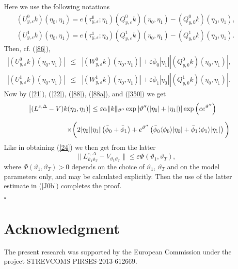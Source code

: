 \documentclass[reqno,11pt]{amsart}
\theoremstyle{definition}
\theoremstyle{remark}
\numberwithin{equation}{section}
\begin{document}
Here we use the following notations
\begin{gather*}
  
(U^0_{y,\varepsilon} k) (\eta_0,\eta_1) =
e(\tau^0_{y,\varepsilon};\eta_1) (Q^0_{y,\varepsilon} k)
(\eta_0,\eta_1) - (Q^0_{y,0} k) (\eta_0,\eta_1), \\[.2cm]
(U^1_{y,\varepsilon} k) (\eta_0,\eta_1) =
e(\tau^1_{y,\varepsilon};\eta_0) (Q^1_{y,\varepsilon} k)
(\eta_0,\eta_1) - (Q^1_{y,0} k) (\eta_0,\eta_1). \nonumber
\end{gather*}
Then, cf. (\ref{86}),
\begin{eqnarray*}
  
\left\vert (U^0_{y,\varepsilon} k) (\eta_0,\eta_1)\right\vert & \leq
& \left\vert (W^0_{y,\varepsilon} k) (\eta_0,\eta_1)\right\vert +
\varepsilon \bar{\phi}_0 |\eta_1|\left\vert(Q^0_{y,0} k)
(\eta_0,\eta_1)\right\vert, \qquad \\[.2cm]
\left\vert (U^1_{y,\varepsilon} k) (\eta_0,\eta_1)\right\vert & \leq
& \left\vert (W^1_{y,\varepsilon} k) (\eta_0,\eta_1)\right\vert +
\varepsilon \bar{\phi}_1 |\eta_0|\left\vert(Q^1_{y,0} k)
(\eta_0,\eta_1)\right\vert.\nonumber
\end{eqnarray*}
Now by (\ref{21}), (\ref{22}), (\ref{88}), (\ref{88a}), and
(\ref{350}) we get
\begin{eqnarray*}
  \label{353}
 & & \left\vert(L^{\varepsilon,\Delta} - V)k(\eta_0 ,
 \eta_1)\right\vert \leq
\varepsilon \alpha \|k\|_{\vartheta''} \exp\left[ \vartheta''
(|\eta_0|+|\eta_1|)\right]\exp\left( ce^{\vartheta''}\right) \qquad
\\[.2cm]
& & \qquad \times \bigg{(}
2|\eta_0||\eta_1|\left(\bar{\phi}_0+\bar{\phi}_1\right) +
e^{\vartheta''} \left(\bar{\phi}_0 \langle \phi_0 \rangle |\eta_0| +
\bar{\phi}_1 \langle \phi_1 \rangle |\eta_1| \right) \bigg{)}
\end{eqnarray*}
Like in obtaining (\ref{24}) we then get from the latter
\begin{equation*}
 
\|L^{\varepsilon,\Delta}_{\vartheta_1 \vartheta_T} - V_{\vartheta_1
\vartheta_T}\| \leq \varepsilon \varPhi(\vartheta_1, \vartheta_T),
\end{equation*}
where $\varPhi(\vartheta_1, \vartheta_T)>0$ depends  on the choice
of $\vartheta_1$, $\vartheta_T$ and on the model parameters only,
and may be calculated explicitly. Then the use of the latter
estimate in (\ref{J0b}) completes the proof.

\hfill$\square $

\section*{Acknowledgment}
The present research was supported by the European Commission under
the project STREVCOMS PIRSES-2013-612669.
\end{document}
